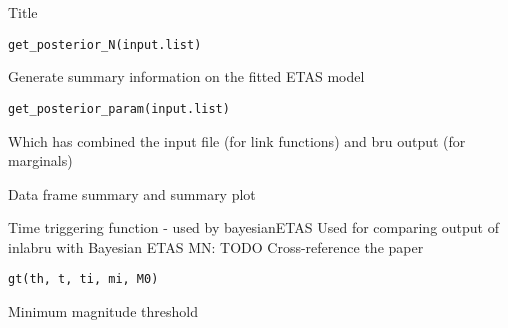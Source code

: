 \documentclass[letterpaper]{book}
\begin{document}
%
\begin{Description}\relax
Title
\end{Description}
%
\begin{Usage}
\begin{verbatim}
get_posterior_N(input.list)
\end{verbatim}
\end{Usage}
%
\begin{Arguments}
\begin{ldescription}
\item[\code{input.list}] 
\end{ldescription}
\end{Arguments}
%
\begin{Description}\relax
Generate summary information on the fitted ETAS model
\end{Description}
%
\begin{Usage}
\begin{verbatim}
get_posterior_param(input.list)
\end{verbatim}
\end{Usage}
%
\begin{Arguments}
\begin{ldescription}
\item[\code{input.list}] Which has combined the input file (for link functions) and bru output (for marginals)
\end{ldescription}
\end{Arguments}
%
\begin{Value}
Data frame summary and summary plot
\end{Value}
%
\begin{Description}\relax
Time triggering function - used by bayesianETAS
Used for comparing output of inlabru with Bayesian ETAS
MN: TODO Cross-reference the paper
\end{Description}
%
\begin{Usage}
\begin{verbatim}
gt(th, t, ti, mi, M0)
\end{verbatim}
\end{Usage}
%
\begin{Arguments}
\begin{ldescription}
\item[\code{M0}] Minimum magnitude threshold
\end{ldescription}
\end{Arguments}
\end{document}
